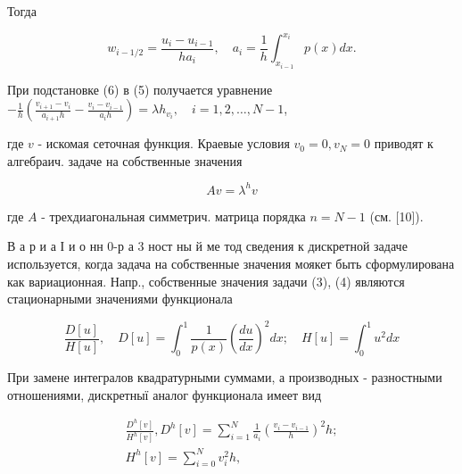 \documentclass[10pt]{article}
\begin{document}
Тогда



\[

w_{i-1 / 2}=\frac{u_{i}-u_{i-1}}{h a_{i}}, \quad a_{i}=\frac{1}{h} \int_{x_{i-1}}^{x_{i}} p(x) d x .

\]



При подстановке (6) в (5) получается уравнение $-\frac{1}{h}\left(\frac{v_{i+1}-v_{i}}{a_{i+1} h}-\frac{v_{i}-v_{i-1}}{a_{i} h}\right)=\lambda h_{v_{i}}, \quad i=1,2, \ldots, N-1$,



где $v$ - искомая сеточная функция. Краевые условия $v_{0}=0, v_{N}=0$ приводят к алгебраич. задаче на собственные значения



\[

A v=\lambda^{h} v

\]



где $A$ - трехдиагональная симметрич. матрица порядка $n=N-1$ (см. [10]).



В а р и а І и о нн 0-р а 3 ност ны й ме тод сведения к дискретной задаче используется, когда задача на собственные значения моякет быть сформулирована как вариационная. Напр., собственные значения задачи (3), (4) являются стационарными значениями функционала



\[

\frac{D[u]}{H[u]}, \quad D[u]=\int_{0}^{1} \frac{1}{p(x)}\left(\frac{d u}{d x}\right)^{2} d x ; \quad H[u]=\int_{0}^{1} u^{2} d x

\]



При замене интегралов квадратурными суммами, а производных - разностными отношениями, дискретныї аналог функционала имеет вид



\[

\begin{gathered}

\frac{D^{h}[v]}{H^{h}[v]}, D^{h}[v]=\sum_{i=1}^{N} \frac{1}{a_{i}}\left(\frac{v_{i}-v_{i-1}}{h}\right)^{2} h ; \\

H^{h}[v]=\sum_{i=0}^{N} v_{i}^{2} h,

\end{gathered}

\]
\end{document}
